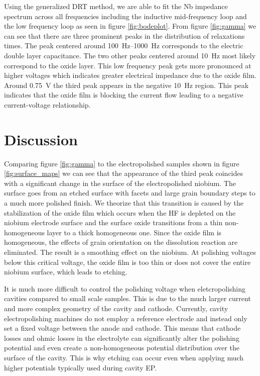 \documentclass{revtex4-2}
\begin{document}
Using the generalized DRT method, we are able to fit the Nb impedance spectrum across all frequencies including the inductive mid-frequency loop and the low frequency loop as seen in figure \ref{fig:bodeplot}. From figure \ref{fig:gamma} we can see that there are three prominent peaks in the distribution of relaxations times. The peak centered around \qtyrange{100}{1000}{\hertz} corresponds to the electric double layer capacitance. The two other peaks centered around \qty{10}{\hertz} most likely correspond to the oxide layer. This low frequency peak gets more pronounced at higher voltages which indicates greater electrical impedance due to the oxide film. Around \qty{0.75}{\volt} the third peak appears in the negative \qty{10}{\hertz} region. This peak indicates that the oxide film is blocking the current flow leading to a negative current-voltage relationship.



\section{Discussion}

Comparing figure \ref{fig:gamma} to the electropolished samples shown in figure \ref{fig:surface_maps} we can see that the appearance of the third peak coincides with a significant change in the surface of the electropolished niobium. The surface goes from an etched surface with facets and large grain boundary steps to a much more polished finish. We theorize that this transition is caused by the stabilization of the oxide film which occurs when the HF is depleted on the niobium electrode surface and the surface oxide transitions from a thin non-homogeneous layer to a thick homogeneous one. Since the oxide film is homogeneous, the effects of grain orientation on the dissolution reaction are eliminated. The result is a smoothing effect on the niobium. At polishing voltages below this critical voltage, the oxide film is too thin or does not cover the entire niobium surface, which leads to etching.

It is much more difficult to control the polishing voltage when eletcropolishing cavities compared to small scale samples. This is due to the much larger current and more complex geometry of the cavity and cathode. Currently, cavity electropolishing machines do not employ a reference electrode and instead only set a fixed voltage between the anode and cathode. This means that cathode losses and ohmic losses in the electrolyte can significantly alter the polishing potential and even create a non-homogeneous potential distribution over the surface of the cavity. This is why etching can occur even when applying much higher potentials typically used during cavity EP.
\end{document}
